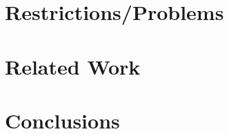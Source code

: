 \documentclass[acmsmall,screen,review]{acmart}
\begin{document}
\section{Restrictions/Problems}

\section{Related Work}


\section{Conclusions}
\label{sec:conclusions}




\end{document}
